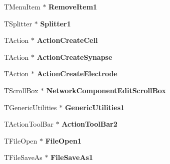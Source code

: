 \begin{DoxyCompactItemize}
\item 
\hypertarget{class_t_network_g_u_i_aef13ef2788870ed25de8fa8f302cb3fe}{T\+Menu\+Item $\ast$ {\bfseries Remove\+Item1}}\label{class_t_network_g_u_i_aef13ef2788870ed25de8fa8f302cb3fe}

\item 
\hypertarget{class_t_network_g_u_i_a05b08e1472ec6c2a3eb697684331bfcc}{T\+Splitter $\ast$ {\bfseries Splitter1}}\label{class_t_network_g_u_i_a05b08e1472ec6c2a3eb697684331bfcc}

\item 
\hypertarget{class_t_network_g_u_i_ae9941e8e08025b9dbf0e6c2036cf309c}{T\+Action $\ast$ {\bfseries Action\+Create\+Cell}}\label{class_t_network_g_u_i_ae9941e8e08025b9dbf0e6c2036cf309c}

\item 
\hypertarget{class_t_network_g_u_i_a5948045e066b60273ec9b45f3c1238a9}{T\+Action $\ast$ {\bfseries Action\+Create\+Synapse}}\label{class_t_network_g_u_i_a5948045e066b60273ec9b45f3c1238a9}

\item 
\hypertarget{class_t_network_g_u_i_aab2ec986f74e1ec192e96bd64c85bf5a}{T\+Action $\ast$ {\bfseries Action\+Create\+Electrode}}\label{class_t_network_g_u_i_aab2ec986f74e1ec192e96bd64c85bf5a}

\item 
\hypertarget{class_t_network_g_u_i_aa138efcd0f908c53848b9cf696c63044}{T\+Scroll\+Box $\ast$ {\bfseries Network\+Component\+Edit\+Scroll\+Box}}\label{class_t_network_g_u_i_aa138efcd0f908c53848b9cf696c63044}

\item 
\hypertarget{class_t_network_g_u_i_a52f28057fa7a38ae63169b38a35ea2e7}{T\+Generic\+Utilities $\ast$ {\bfseries Generic\+Utilities1}}\label{class_t_network_g_u_i_a52f28057fa7a38ae63169b38a35ea2e7}

\item 
\hypertarget{class_t_network_g_u_i_aa77be94fb66cff42fd26b52709aaf05e}{T\+Action\+Tool\+Bar $\ast$ {\bfseries Action\+Tool\+Bar2}}\label{class_t_network_g_u_i_aa77be94fb66cff42fd26b52709aaf05e}

\item 
\hypertarget{class_t_network_g_u_i_af481478dd4a11e6ad88e8a93db33f4d1}{T\+File\+Open $\ast$ {\bfseries File\+Open1}}\label{class_t_network_g_u_i_af481478dd4a11e6ad88e8a93db33f4d1}

\item 
\hypertarget{class_t_network_g_u_i_a13837c38fc985da34c510f6359784b6b}{T\+File\+Save\+As $\ast$ {\bfseries File\+Save\+As1}}\label{class_t_network_g_u_i_a13837c38fc985da34c510f6359784b6b}


\end{DoxyCompactItemize}
